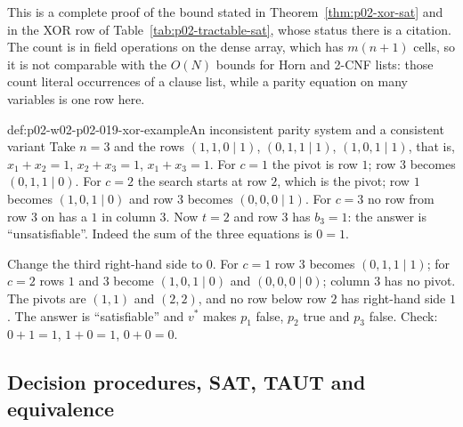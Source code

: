 This is a complete proof of the bound stated in
Theorem~\ref{thm:p02-xor-sat} and in the XOR row of
Table~\ref{tab:p02-tractable-sat}, whose status there is a citation.  The
count is in field operations on the dense array, which has \(m(n+1)\) cells,
so it is not comparable with the \(O(N)\) bounds for Horn and 2-CNF lists:
those count literal occurrences of a clause list, while a parity equation on
many variables is one row here.

\begin{hbexample}{def:p02-w02-p02-019-xor-example}{An inconsistent parity system and a consistent variant}
Take \(n=3\) and the rows \((1,1,0\mid 1)\), \((0,1,1\mid 1)\),
\((1,0,1\mid 1)\), that is, \(x_1+x_2=1\), \(x_2+x_3=1\), \(x_1+x_3=1\).
For \(c=1\) the pivot is row \(1\); row \(3\) becomes \((0,1,1\mid 0)\).
For \(c=2\) the search starts at row \(2\), which is the pivot; row \(1\)
becomes \((1,0,1\mid 0)\) and row \(3\) becomes \((0,0,0\mid 1)\).  For
\(c=3\) no row from row \(3\) on has a \(1\) in column \(3\).  Now \(t=2\)
and row \(3\) has \(b_3=1\): the answer is ``unsatisfiable''.  Indeed the sum
of the three equations is \(0=1\).

Change the third right-hand side to \(0\).  For \(c=1\) row \(3\) becomes
\((0,1,1\mid 1)\); for \(c=2\) rows \(1\) and \(3\) become
\((1,0,1\mid 0)\) and \((0,0,0\mid 0)\); column \(3\) has no pivot.  The
pivots are \((1,1)\) and \((2,2)\), and no row below row \(2\) has right-hand
side \(1\).
The answer is ``satisfiable'' and \(v^{*}\) makes \(p_1\) false, \(p_2\)
true and \(p_3\) false.  Check: \(0+1=1\), \(1+0=1\), \(0+0=0\).
\end{hbexample}

\subsection{Decision procedures, SAT, TAUT and equivalence}
\label{sec:p02-w02-p02-019-complexity}

